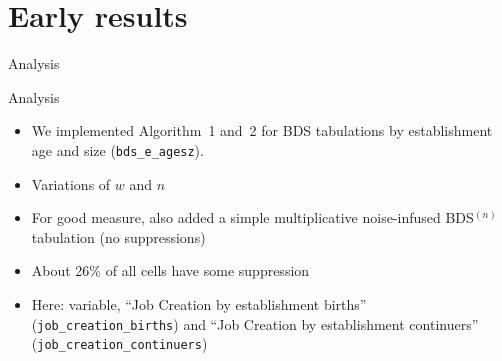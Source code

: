 \section[Results]{Early results}


\begin{frame}{Analysis}
\begin{block}{Analysis}
\begin{itemize}[<+->]
\item We implemented Algorithm~1 and~2 for \ac{BDS} tabulations by \alert<1>{establishment age 
and 
size} ({\tt bds\_e\_agesz}). 
\item Variations of $w$ and $n$
\item For good measure, also added a simple multiplicative noise-infused BDS$^{(n)}$ tabulation (no suppressions)
\item About 26\% of all cells have some suppression
\item Here: variable, ``Job Creation by establishment births'' ({\tt job\_creation\_births}) and 
``Job Creation by establishment continuers'' ({\tt job\_creation\_continuers}) 
\end{itemize}
\end{block}
\end{frame}



